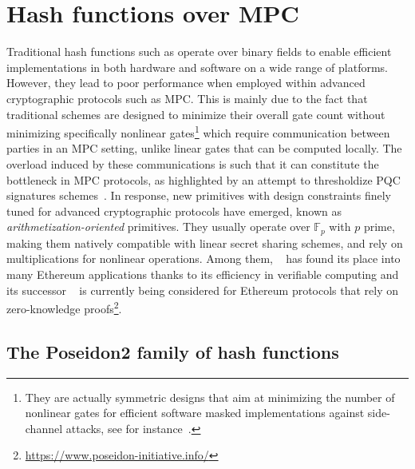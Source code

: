\section{Hash functions over MPC}
Traditional hash functions such as \KECCAK operate over binary fields to enable efficient implementations in both hardware and software on a wide range of platforms.
However, they lead to poor performance when employed within advanced cryptographic protocols such as MPC.
This is mainly due to the fact that traditional schemes are designed to minimize their overall gate count without minimizing specifically nonlinear gates\footnote{They are actually symmetric designs that aim at minimizing the number of nonlinear gates for efficient software masked implementations against side-channel attacks, see for instance~\cite{fse-2014-27573}.} which require communication between parties in an MPC setting, unlike linear gates that can be computed locally.
The overload induced by these communications is such that it can constitute the bottleneck in MPC protocols, as highlighted by an attempt to thresholdize PQC signatures schemes~\cite{sharing_luov19}.
In response, new primitives with design constraints finely tuned for advanced cryptographic protocols have emerged, known as \textit{arithmetization-oriented} primitives.
They usually operate over $\mathbb{F}_p$ with $p$ prime, making them natively compatible with linear secret sharing schemes, and rely on multiplications for nonlinear operations.
Among them, \Poseidon~\cite{poseidon} has found its place into many Ethereum applications thanks to its efficiency in verifiable computing and its successor \PoseidonTwo~\cite{poseidon2} is currently being considered for Ethereum protocols that rely on zero-knowledge proofs\footnote{\url{https://www.poseidon-initiative.info/}}.
\subsection{The Poseidon2 family of hash functions}
